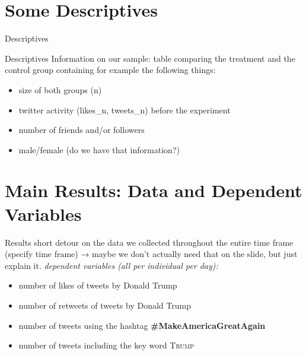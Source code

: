 \documentclass{beamer}
\begin{document}
\section{Some Descriptives}
\begin{frame}{Descriptives}
\begin{table}
		\begin{center}
	\tiny
	
	\end{center}
\end{table}	

\end{frame}

\begin{frame}{Descriptives}
	Information on our sample: table comparing the treatment and the control group containing for example the following things:


	\begin{itemize}
\item size of both groups (n)
\item twitter activity (likes\_n, tweets\_n) before the experiment
\item number of friends and/or followers
\item male/female (do we have that information?)
	\end{itemize}
\end{frame}



\section{Main Results: Data and Dependent Variables}
\begin{frame}{Results}
short detour on the data we collected throughout the entire time frame (specify time frame) → maybe we don’t actually need that on the slide, but just explain it. \textit{dependent variables (all per individual per day):}

\begin{itemize}
\item number of likes of tweets by Donald Trump
\item number of retweets of tweets by Donald Trump
\item number of tweets using the hashtag \textbf{\#MakeAmericaGreatAgain}
\item number of tweets including the key word \textsc{Trump} 
\end{itemize} 
\end{frame}
\end{document}
